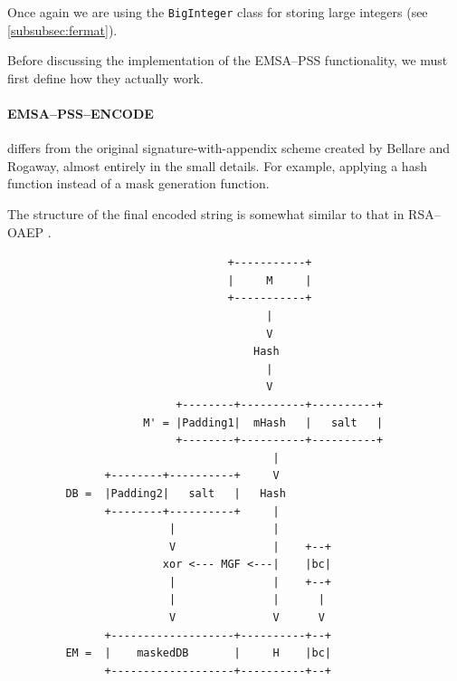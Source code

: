     Once again we are using the \verb!BigInteger! class for storing large integers (see \textsection\ref{subsubsec:fermat}).
    
    Before discussing the implementation of the EMSA--PSS functionality, we must first define how they actually work.
    
    \paragraph{EMSA--PSS--ENCODE} differs from the original signature-with-appendix scheme created by Bellare and Rogaway, almost entirely in the small details. For example, applying a hash function instead of a mask generation function. 
    
    The structure of the final encoded string is somewhat similar to that in RSA--OAEP \cite{Jonsson:2003aa}. \\
    
    \begin{center}
\begin{lstlisting}
                                  +-----------+
                                  |     M     |
                                  +-----------+
                                        |
                                        V
                                      Hash
                                        |
                                        V
                          +--------+----------+----------+
                     M' = |Padding1|  mHash   |   salt   |
                          +--------+----------+----------+
                                         |
               +--------+----------+     V
         DB =  |Padding2|   salt   |   Hash
               +--------+----------+     |
                         |               |
                         V               |    +--+
                        xor <--- MGF <---|    |bc|
                         |               |    +--+
                         |               |      |
                         V               V      V
               +-------------------+----------+--+
         EM =  |    maskedDB       |     H    |bc|
               +-------------------+----------+--+
\end{lstlisting}
    \end{center}

